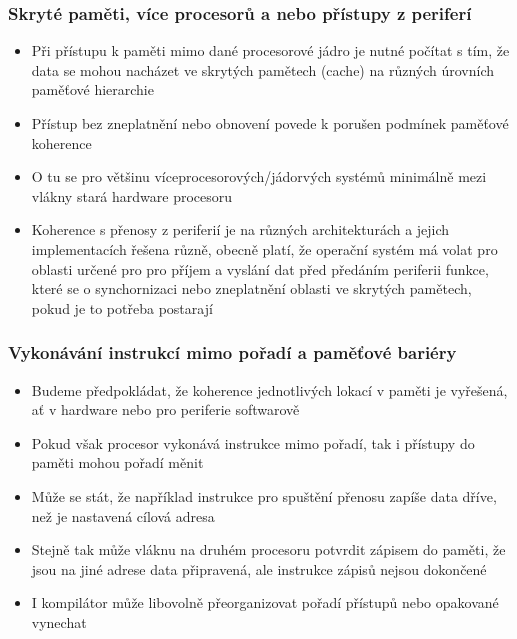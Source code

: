 \documentclass{beamer}
\begin{document}
\begin{frame}
\frametitle{Skryté paměti, více procesorů a nebo přístupy z periferí}

\begin{itemize}
 \item Při přístupu k paměti mimo dané procesorové jádro je nutné počítat s tím, že data se mohou
       nacházet ve skrytých pamětech (cache) na různých úrovních paměťové hierarchie
 \item Přístup bez zneplatnění nebo obnovení povede k porušen podmínek paměťové koherence
 \item O tu se pro většinu víceprocesorových/jádorvých systémů minimálně mezi vlákny
       stará hardware procesoru
 \item Koherence s přenosy z periferií je na různých architekturách a jejich implementacích
       řešena různě, obecně platí, že operační systém má volat pro oblasti určené pro
       pro příjem a vyslání dat před předáním periferii funkce, které se o synchornizaci
       nebo zneplatnění oblasti ve skrytých pamětech, pokud je to potřeba postarají
\end{itemize}
\end{frame}

\begin{frame}[fragile]
\frametitle{Vykonávání instrukcí mimo pořadí a paměťové bariéry}

\begin{itemize}
 \item Budeme předpokládat, že koherence jednotlivých lokací v paměti je vyřešená, ať v hardware nebo pro periferie softwarově
 \item Pokud však procesor vykonává instrukce mimo pořadí, tak i přístupy do paměti mohou pořadí měnit
 \item Může se stát, že například instrukce pro spuštění přenosu zapíše data dříve, než je nastavená cílová adresa
 \item Stejně tak může vláknu na druhém procesoru potvrdit zápisem do paměti, že jsou na jiné adrese data připravená,
       ale instrukce zápisů nejsou dokončené
 \item I kompilátor může libovolně přeorganizovat pořadí přístupů nebo opakované vynechat
\end{itemize}

\end{frame}
\end{document}
